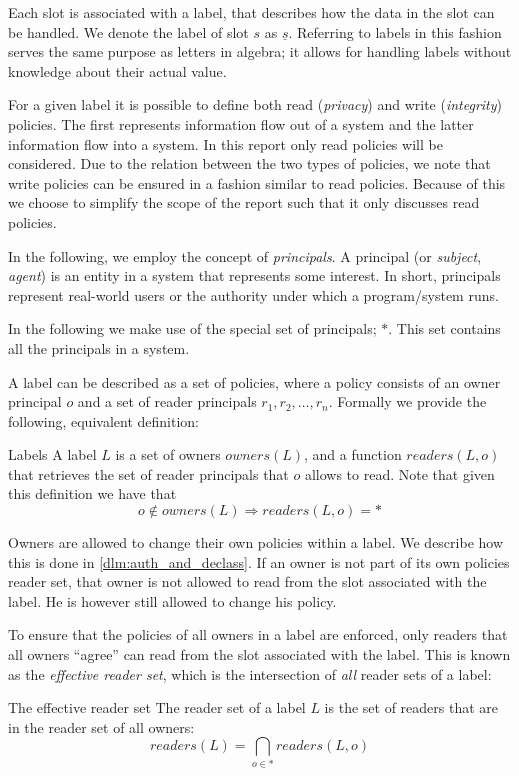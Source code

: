 Each slot is associated with a label, that describes how the data in the slot can be handled.
We denote the label of slot $s$ as $\underline{s}$.
Referring to labels in this fashion serves the same purpose as letters in algebra; it allows for handling labels without knowledge about their actual value.

For a given label it is possible to define both read (\emph{privacy}) and write (\emph{integrity}) policies.
The first represents information flow out of a system and the latter information flow into a system.
In this report only read policies will be considered.
Due to the relation between the two types of policies, we note that write policies can be ensured in a fashion similar to read policies.
Because of this we choose to simplify the scope of the report such that it only discusses read policies.

In the following, we employ the concept of \emph{principals}.
A principal (or \emph{subject}, \emph{agent}) is an entity in a system that represents some interest.
In short, principals represent real-world users or the authority under which a program/system runs.

In the following we make use of the special set of principals; $*$.
This set contains all the principals in a system.

A label can be described as a set of policies, where a policy consists of an owner principal $o$ and a set of reader principals $r_1, r_2, \dots, r_n$.
Formally we provide the following, equivalent definition:
\begin{definition}{Labels}\label{dlm:def:label}
A label $L$ is a set of owners $owners(L)$, and a function $readers(L, o)$ that retrieves the set of reader principals that $o$ allows to read.
Note that given this definition we have that $$o \notin owners(L) \Rightarrow readers(L, o) = *$$
\end{definition}

Owners are allowed to change their own policies within a label.
We describe how this is done in \cref{dlm:auth_and_declass}.
If an owner is not part of its own policies reader set, that owner is not allowed to read from the slot associated with the label.
He is however still allowed to change his policy.

To ensure that the policies of all owners in a label are enforced, only readers that all owners ``agree'' can read from the slot associated with the label.
This is known as the \emph{effective reader set}, which is the intersection of \emph{all} reader sets of a label:
\begin{definition}{The effective reader set}\label{dlm:def:effectivereaders}
  The reader set of a label $L$ is the set of readers that are in the reader set of all owners:
  $$readers(L) = \bigcap_{o \in *} readers(L, o)$$
\end{definition}


